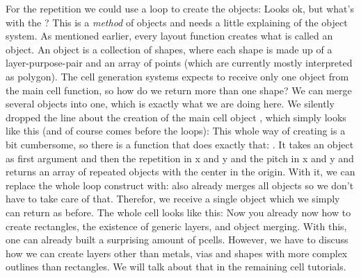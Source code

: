 For the repetition we could use a loop to create the objects:
Looks ok, but what's with the ? This is a \emph{method} of objects and needs a little explaining of the object system. As mentioned
earlier, every layout function creates what is called an object. An object is a collection of shapes, where each shape is made up of a layer-purpose-pair and an
array of points (which are currently mostly interpreted as polygon). The cell generation systems expects to receive only one object from the main cell function, so
how do we return more than one shape? We can merge several objects into one, which is exactly what we are doing here. We silently dropped the line about the creation
of the main cell object , which simply looks like this (and of course comes before the loops):
This whole way of creating is a bit cumbersome, so there is a function that does exactly that: . It takes an object as first argument and
then the repetition in x and y and the pitch in x and y and returns an array of repeated objects with the center in the origin. With it, we can replace the whole
loop construct with:
 also already merges all objects so we don't have to take care of that. Therefor, we receive a single object which we simply can return as
before. The whole cell looks like this:
Now you already now how to create rectangles, the existence of generic layers,  and object merging. With this, one can already built a
surprising amount of pcells. However, we have to discuss how we can create layers other than metals, vias and shapes with more complex outlines than rectangles. We
will talk about that in the remaining cell tutorials.

